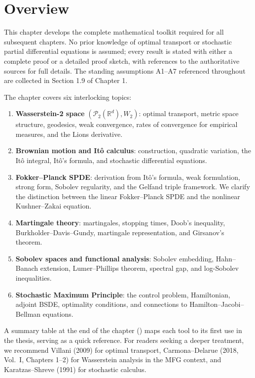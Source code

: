 
\section{Overview}

This chapter develops the complete mathematical toolkit required for all subsequent
chapters. No prior knowledge of optimal transport or stochastic partial differential
equations is assumed; every result is stated with either a complete proof or a detailed
proof sketch, with references to the authoritative sources for full details. The
standing assumptions A1--A7 referenced throughout are collected in Section 1.9 of
Chapter 1.

The chapter covers six interlocking topics:

\begin{enumerate}
    \item \textbf{Wasserstein-2 space} $(\mathcal{P}_2(\mathbb{R}^d), W_2)$: optimal
    transport, metric space structure, geodesics, weak convergence, rates of
    convergence for empirical measures, and the Lions derivative.
    \item \textbf{Brownian motion and It\^o calculus}: construction, quadratic
    variation, the It\^o integral, It\^o's formula, and stochastic differential
    equations.
    \item \textbf{Fokker--Planck SPDE}: derivation from It\^o's formula, weak
    formulation, strong form, Sobolev regularity, and the Gelfand triple framework. We
    clarify the distinction between the linear Fokker--Planck SPDE and the nonlinear
    Kushner--Zakai equation.
    \item \textbf{Martingale theory}: martingales, stopping times, Doob's inequality,
    Burkholder--Davis--Gundy, martingale representation, and Girsanov's
    theorem.
    \item \textbf{Sobolev spaces and functional analysis}: Sobolev embedding,
    Hahn--Banach extension, Lumer--Phillips theorem, spectral gap, and log-Sobolev
    inequalities.
    \item \textbf{Stochastic Maximum Principle}: the control problem, Hamiltonian,
    adjoint BSDE, optimality conditions, and connections to Hamilton--Jacobi--Bellman
    equations.
\end{enumerate}

A summary table at the end of the chapter () maps each tool to its
first use in the thesis, serving as a quick reference. For readers seeking a deeper
treatment, we recommend Villani (2009) for optimal transport, Carmona--Delarue (2018,
Vol.\ I, Chapters 1--2) for Wasserstein analysis in the MFG context, and
Karatzas--Shreve (1991) for stochastic calculus.



